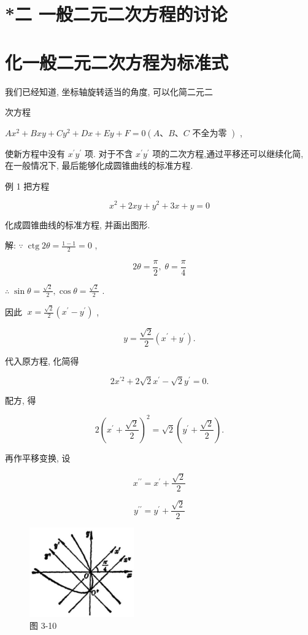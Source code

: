 \documentclass[lang=cn,newtx,10pt,scheme=chinese]{elegantbook}
\begin{document}
\section*{*二 一般二元二次方程的讨论}

\section{化一般二元二次方程为标准式}

我们已经知道, 坐标轴旋转适当的角度, 可以化简二元二

次方程

\(A{x}^{2} + {Bxy} + C{y}^{2} + {Dx} + {Ey} + F = 0\left( {A\text{、}B\text{、}C\text{ 不全为零 }}\right)\) ,

使新方程中没有 \({x}^{\prime }{y}^{\prime }\) 项. 对于不含 \({x}^{\prime }{y}^{\prime }\) 项的二次方程,通过平移还可以继续化简, 在一般情况下, 最后能够化成圆锥曲线的标准方程.

例 1 把方程

\[
    {x}^{2} + {2xy} + {y}^{2} + {3x} + y = 0
\]

化成圆锥曲线的标准方程, 并画出图形.

解: \(\because \;\operatorname{ctg}{2\theta } = \frac{1 - 1}{2} = 0\) ,

\[
    {2\theta } = \frac{\pi }{2},\;\theta = \frac{\pi }{4}
\]

\(\therefore \;\sin \theta = \frac{\sqrt{2}}{2},\cos \theta = \frac{\sqrt{2}}{2}\) .

因此 \(\;x = \frac{\sqrt{2}}{2}\left( {{x}^{\prime } - {y}^{\prime }}\right)\) ,

\[
  y = \frac{\sqrt{2}}{2}\left( {{x}^{\prime } + {y}^{\prime }}\right) .
\]

代入原方程, 化简得

\[
  2{x}^{\prime 2} + 2\sqrt{2}{x}^{\prime } - \sqrt{2}{y}^{\prime } = 0.
\]

配方, 得

\[
  2{\left( {x}^{\prime } + \frac{\sqrt{2}}{2}\right) }^{2} = \sqrt{2}\left( {{y}^{\prime } + \frac{\sqrt{2}}{2}}\right) .
\]

再作平移变换, 设

\[
    {x}^{\prime \prime } = {x}^{\prime } + \frac{\sqrt{2}}{2}
\]

\[
    {y}^{\prime \prime } = {y}^{\prime } + \frac{\sqrt{2}}{2}
\]

\begin{figure}[h]
  \centering
  \includegraphics[max width=0.4\textwidth]{images/01912cc2-ffb6-728e-9ae7-b113ff05c64b_149_308229.jpg}
  \caption{图 3-10}
\end{figure}
\end{document}
